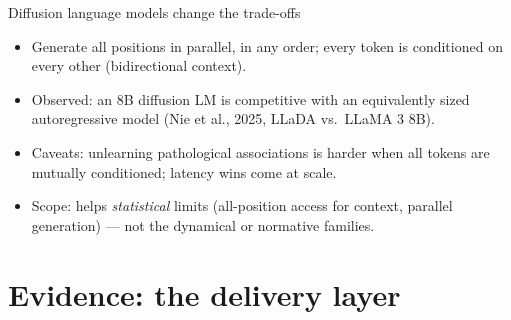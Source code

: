 \documentclass[11pt]{beamer}
\begin{document}
\begin{frame}{Diffusion language models change the trade-offs}
  \begin{itemize}
    \item Generate \alert{all positions in parallel}, in any order; every
          token is conditioned on every other (bidirectional context).
    \item Observed: an 8B diffusion LM is competitive with an equivalently
          sized autoregressive model (Nie et al., 2025, LLaDA vs.\ LLaMA 3
          8B).
    \item Caveats: unlearning pathological associations is harder when all
          tokens are mutually conditioned; latency wins come at scale.
    \item Scope: helps \emph{statistical} limits (all-position access for
          context, parallel generation) --- not the dynamical or normative
          families.
  \end{itemize}
\end{frame}

\section{Evidence: the delivery layer}
\end{document}
